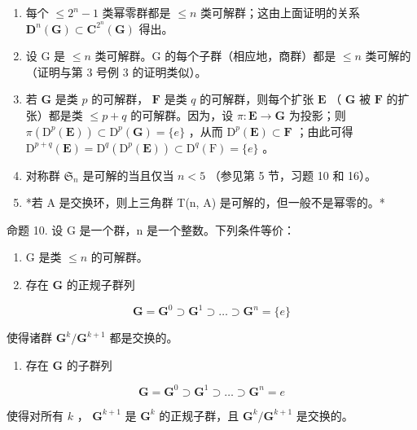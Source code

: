 \begin{enumerate}
\def\labelenumi{(\arabic{enumi})}
\setcounter{enumi}{1}
\item
  每个 \(\leqslant 2^{n} - 1\) 类幂零群都是 \(\leqslant n\) 类可解群；这由上面证明的关系 \(\mathbf{D}^n (\mathbf{G})\subset \mathbf{C}^{2^n}(\mathbf{G})\) 得出。
\item
  设 G 是 \(\leqslant n\) 类可解群。G 的每个子群（相应地，商群）都是 \(\leqslant n\) 类可解的（证明与第 3 号例 3 的证明类似）。
\item
  若 \(\mathbf{G}\) 是类 \(p\) 的可解群， \(\mathbf{F}\) 是类 \(q\) 的可解群，则每个扩张 \(\mathbf{E}\) （ \(\mathbf{G}\) 被 \(\mathbf{F}\) 的扩张）都是类 \(\leqslant p + q\) 的可解群。因为，设 \(\pi: \mathbf{E} \to \mathbf{G}\) 为投影；则 \(\pi(\mathrm{D}^p(\mathbf{E})) \subset \mathrm{D}^p(\mathbf{G}) = \{e\}\) ，从而 \(\mathrm{D}^p(\mathbf{E}) \subset \mathbf{F}\) ；由此可得 \(\mathrm{D}^{p+q}(\mathbf{E}) = \mathrm{D}^q(\mathrm{D}^p(\mathbf{E})) \subset \mathrm{D}^q(\mathrm{F}) = \{e\}\) 。
\item
  对称群 \(\mathfrak{S}_n\) 是可解的当且仅当 \(n < 5\) （参见第 5 节，习题 10 和 16）。
\item
  *若 A 是交换环，则上三角群 T(n, A) 是可解的，但一般不是幂零的。*
\end{enumerate}

命题 10. 设 G 是一个群，n 是一个整数。下列条件等价：

\begin{enumerate}
\def\labelenumi{(\roman{enumi})}
\item
  G 是类 \(\leqslant n\) 的可解群。
\item
  存在 \(\mathbf{G}\) 的正规子群列
\end{enumerate}

\[
\mathbf {G} = \mathbf {G} ^ {0} \supset \mathbf {G} ^ {1} \supset \dots \supset \mathbf {G} ^ {n} = \{e \}
\]

使得诸群 \(\mathbf{G}^k /\mathbf{G}^{k + 1}\) 都是交换的。

\begin{enumerate}
\def\labelenumi{(\roman{enumi})}
\setcounter{enumi}{2}
\tightlist
\item
  存在 \(\mathbf{G}\) 的子群列
\end{enumerate}

\[
\mathbf {G} = \mathbf {G} ^ {0} \supset \mathbf {G} ^ {1} \supset \dots \supset \mathbf {G} ^ {n} = e
\]

使得对所有 \(k\) ， \(\mathbf{G}^{k+1}\) 是 \(\mathbf{G}^k\) 的正规子群，且 \(\mathbf{G}^k/\mathbf{G}^{k+1}\) 是交换的。

